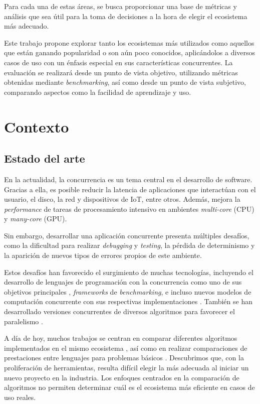 \documentclass[11pt]{article}
\let\Oldsection\section
\renewcommand{\section}{\FloatBarrier\Oldsection}
\let\Oldsubsection\subsection
\renewcommand{\subsection}{\FloatBarrier\Oldsubsection}
\newcommand{\english}[1]{\textit{#1}}
\begin{document}
Para cada una de estas áreas, se busca proporcionar una base de métricas y análisis que sea útil para la toma de decisiones a la hora de elegir el ecosistema más adecuado.

Este trabajo propone explorar tanto los ecosistemas más utilizados como aquellos que están ganando popularidad o son aún poco conocidos, aplicándolos a diversos casos de uso con un énfasis especial en sus características concurrentes. La evaluación se realizará desde un punto de vista objetivo, utilizando métricas obtenidas mediante \english{benchmarking}, así como desde un punto de vista subjetivo, comparando aspectos como la facilidad de aprendizaje y uso.

\newpage

\section{Contexto}

\subsection{Estado del arte}

En la actualidad, la concurrencia es un tema central en el desarrollo de software. Gracias a ella, es posible reducir la latencia de aplicaciones que interactúan con el usuario, el disco, la red y dispositivos de IoT, entre otros. Además, mejora la \english{performance} de tareas de procesamiento intensivo en ambientes \english{multi-core} (CPU) y \english{many-core} (GPU).

Sin embargo, desarrollar una aplicación concurrente presenta múltiples desafíos, como la dificultad para realizar \textit{debugging} y \textit{testing}, la pérdida de determinismo y la aparición de nuevos tipos de errores propios de este ambiente.

Estos desafíos han favorecido el surgimiento de muchas tecnologías, incluyendo el desarrollo de lenguajes de programación con la concurrencia como uno de sus objetivos principales \cite{rust:ex:fearless_concurrency} \cite{go:ex:concurrency_patterns}, \textit{frameworks} de \textit{benchmarking}, e incluso nuevos modelos de computación concurrente con sus respectivas implementaciones \cite{state_of_the_art:reactors}. También se han desarrollado versiones concurrentes de diversos algoritmos para favorecer el paralelismo \cite{state_of_the_art:huffman_gpu}.

A día de hoy, muchos trabajos se centran en comparar diferentes algoritmos implementados en el mismo ecosistema \cite{state_of_the_art:crypto_benchmarks} \cite{state_of_the_art:nn_benchmarks}, así como en realizar comparaciones de prestaciones entre lenguajes para problemas básicos \cite{state_of_the_art:lang_benchmarks}. Descubrimos que, con la proliferación de herramientas, resulta difícil elegir la más adecuada al iniciar un nuevo proyecto en la industria. Los enfoques centrados en la comparación de algoritmos no permiten determinar cuál es el ecosistema más eficiente en casos de uso reales.
\end{document}
